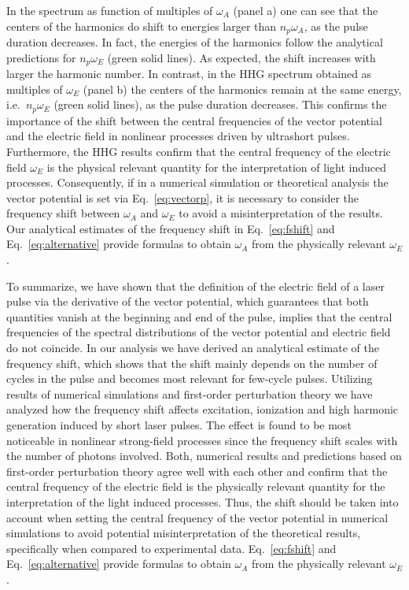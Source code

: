 In the spectrum as function of multiples of $\omega_A$ (panel a) one can see that the centers of the harmonics do shift to energies larger than $n_p\omega_A$, as the pulse duration decreases. In fact, the energies of the harmonics follow the analytical predictions for $n_p\omega_E$ (green solid lines). As expected, the shift increases with larger the harmonic number. In contrast, in the HHG spectrum obtained as multiples of $\omega_E$ (panel b) the centers of the harmonics remain at the same energy, i.e.~$n_p\omega_E$ (green solid lines), as the pulse duration decreases. This confirms the importance of the shift between the central frequencies of the vector potential and the electric field in nonlinear processes driven by ultrashort pulses. Furthermore, the HHG results confirm that the central frequency of the electric field $\omega_E$ is the physical relevant quantity for the interpretation of light induced processes. Consequently, if in a numerical simulation or theoretical analysis the vector potential is set via Eq.~\ref{eq:vectorp}, it is necessary to consider the frequency shift between $\omega_A$ and $\omega_E$ to avoid a misinterpretation of the results. Our analytical estimates of the frequency shift in Eq.~\ref{eq:fshift} and Eq.~\ref{eq:alternative} provide formulas to obtain $\omega_A$ from the physically relevant $\omega_E$.


To summarize, we have shown that the definition of the electric field of a laser pulse via the derivative of the vector potential, which guarantees that both quantities vanish at the beginning and end of the pulse, implies that the central frequencies of the spectral distributions of the vector potential and electric field do not coincide. In our analysis we have derived an analytical estimate of the frequency shift, which shows that the shift mainly depends on the number of cycles in the pulse and becomes most relevant for few-cycle pulses. Utilizing results of numerical simulations and first-order perturbation theory we have analyzed how the frequency shift affects excitation, ionization and high harmonic generation induced by short laser pulses. The effect is found to be most noticeable in nonlinear strong-field processes since the frequency shift scales with the number of photons involved. Both, numerical results and predictions based on first-order perturbation theory agree well with each other and confirm that the central frequency of the electric field is the physically relevant quantity for the interpretation of the light induced processes. Thus, the shift should be taken into account when setting the central frequency of the vector potential in numerical simulations to avoid potential misinterpretation of the theoretical results, specifically when compared to experimental data. Eq.~\ref{eq:fshift} and Eq.~\ref{eq:alternative} provide formulas to obtain $\omega_A$ from the physically relevant $\omega_E$.


